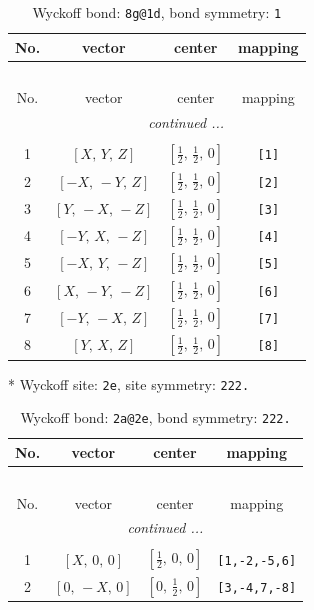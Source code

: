 \documentclass[fleqn,8pt]{jsarticle}
\begin{document}
\begin{longtable}{cccc}
\caption{Wyckoff bond: {\tt 8g@1d}, bond symmetry: {\tt 1}}
 \\
 \hline \hline
No. & vector & center & mapping \\ \hline \endfirsthead

\multicolumn{3}{l}{\tablename\ \thetable{}} \\
 \hline \hline
No. & vector & center & mapping \\ \hline \endhead

 \hline \hline
\multicolumn{3}{r}{\footnotesize\it continued ...} \\ \endfoot

 \hline \hline
\multicolumn{3}{r}{} \\ \endlastfoot

1 & $\left[ X,\, Y,\, Z \right]$ & $\left[ \frac{1}{2},\, \frac{1}{2},\, 0 \right]$ & {\tt [1]} \\ \hline
2 & $\left[ - X,\, - Y,\, Z \right]$ & $\left[ \frac{1}{2},\, \frac{1}{2},\, 0 \right]$ & {\tt [2]} \\ \hline
3 & $\left[ Y,\, - X,\, - Z \right]$ & $\left[ \frac{1}{2},\, \frac{1}{2},\, 0 \right]$ & {\tt [3]} \\ \hline
4 & $\left[ - Y,\, X,\, - Z \right]$ & $\left[ \frac{1}{2},\, \frac{1}{2},\, 0 \right]$ & {\tt [4]} \\ \hline
5 & $\left[ - X,\, Y,\, - Z \right]$ & $\left[ \frac{1}{2},\, \frac{1}{2},\, 0 \right]$ & {\tt [5]} \\ \hline
6 & $\left[ X,\, - Y,\, - Z \right]$ & $\left[ \frac{1}{2},\, \frac{1}{2},\, 0 \right]$ & {\tt [6]} \\ \hline
7 & $\left[ - Y,\, - X,\, Z \right]$ & $\left[ \frac{1}{2},\, \frac{1}{2},\, 0 \right]$ & {\tt [7]} \\ \hline
8 & $\left[ Y,\, X,\, Z \right]$ & $\left[ \frac{1}{2},\, \frac{1}{2},\, 0 \right]$ & {\tt [8]} \\
\end{longtable}
* Wyckoff site: {\tt 2e}, site symmetry: {\tt 222.}
\renewcommand{\arraystretch}{1.2}
\begin{longtable}{cccc}
\caption{Wyckoff bond: {\tt 2a@2e}, bond symmetry: {\tt 222.}}
 \\
 \hline \hline
No. & vector & center & mapping \\ \hline \endfirsthead

\multicolumn{3}{l}{\tablename\ \thetable{}} \\
 \hline \hline
No. & vector & center & mapping \\ \hline \endhead

 \hline \hline
\multicolumn{3}{r}{\footnotesize\it continued ...} \\ \endfoot

 \hline \hline
\multicolumn{3}{r}{} \\ \endlastfoot

1 & $\left[ X,\, 0,\, 0 \right]$ & $\left[ \frac{1}{2},\, 0,\, 0 \right]$ & {\tt [1,-2,-5,6]} \\ \hline
2 & $\left[ 0,\, - X,\, 0 \right]$ & $\left[ 0,\, \frac{1}{2},\, 0 \right]$ & {\tt [3,-4,7,-8]} \\
\end{longtable}
\end{document}
